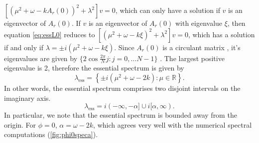 \documentclass[11pt,reqno]{amsart}
\def\R{{\mathbb R}}
\begin{document}
$\left[ \left( \mu^2 + \omega - k A_r(0) \right)^2 + \lambda^2 \right]v = 0$, which can only have a solution if $v$ is an eigenvector of $A_r(0)$. If $v$ is an eigenvector of $A_r(0)$ with eigenvalue $\xi$, then equation \cref{eq:essL0} reduces to $\left[ \left( \mu^2 + \omega - k \xi \right)^2 + \lambda^2 \right]v = 0$, which has a solution if and only if $\lambda = \pm i \left( \mu^2 + \omega - k \xi \right)$. Since $A_r(0)$ is a circulant matrix \cite{davis2012circulant}, it's eigenvalues are given by $\{ 2 \cos \frac{2 \pi}{N}j : j = 0, \dots N-1 \}$ . The largest positive eigenvalue is 2, therefore the essential spectrum is given by
\[
\lambda_{\text{ess}} = \left\{ \pm i \left( \mu^2 + \omega - 2 k \right) : \mu \in \R \right\}.
\]
In other words, the essential spectrum comprises two disjoint intervals on the imaginary axis.
\begin{equation}\label{eq:less}
\lambda_{\text{ess}} = i (-\infty, -\alpha] \cup i [\alpha, \infty).
\end{equation}
In particular, we note that the essential spectrum is bounded away from the origin. For $\phi = 0$, $\alpha = \omega - 2k$, which agrees very well with the numerical spectral computations (\cref{fig:phi0speca}). 
\end{document}
